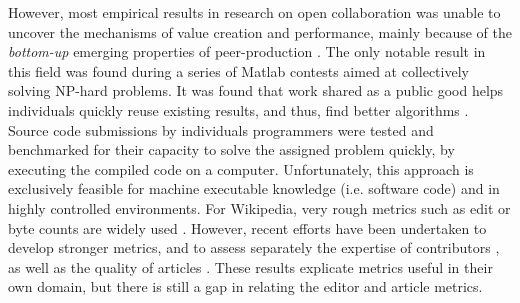 However, most empirical results in research on open collaboration was unable to uncover the mechanisms of value creation and performance, mainly because of the {\it bottom-up} emerging properties of peer-production \cite{benkler2002}.  The only notable result in this field was found during a series of Matlab contests aimed at collectively solving NP-hard problems. It was found that work shared as a public good helps individuals quickly reuse existing results, and thus, find better algorithms \cite{gulley2010}. Source code submissions by individuals programmers were tested and benchmarked for their capacity to solve the assigned problem quickly, by executing the compiled code on a computer. Unfortunately, this approach is exclusively feasible for machine executable knowledge (i.e. software code) and in highly controlled environments. For Wikipedia, very rough metrics such as edit or byte counts are widely used \cite{editcountitis}.  However, recent efforts have been undertaken to develop stronger metrics, and to assess separately the expertise of contributors \cite{geiger2013}, as well as the quality of articles \cite{wang2013tell}. These results explicate metrics useful in their own domain, but there is still a gap in relating the editor and article metrics.
